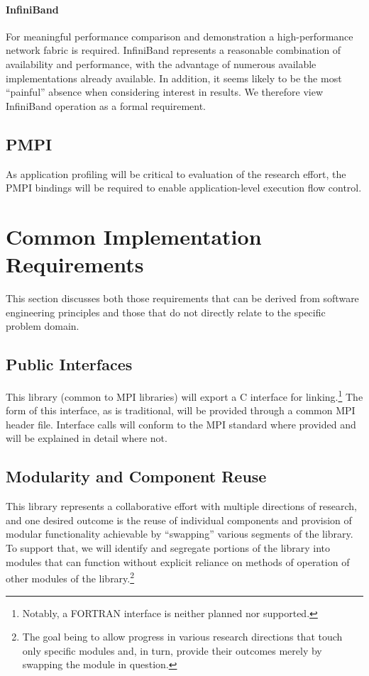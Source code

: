 \documentclass{article}
\begin{document}
\paragraph{InfiniBand}  For meaningful performance comparison and demonstration a high-performance network fabric is required.  InfiniBand represents a reasonable combination of availability and performance, with the advantage of numerous available implementations already available.  In addition, it seems likely to be the most ``painful'' absence when considering interest in results.  We therefore view InfiniBand operation as a formal requirement.

\subsection{PMPI}

As application profiling will be critical to evaluation of the research effort, the PMPI bindings will be required to enable application-level execution flow control.

\section{Common Implementation Requirements}

This section discusses both those requirements that can be derived from software engineering principles and those that do not directly relate to the specific problem domain.

\subsection{Public Interfaces}

This library (common to MPI libraries) will export a C interface for linking.\footnote{Notably, a FORTRAN interface is neither planned nor supported.}  The form of this interface, as is traditional, will be provided through a common MPI header file.  Interface calls will conform to the MPI standard where provided and will be explained in detail where not.

\subsection{Modularity and Component Reuse}

This library represents a collaborative effort with multiple directions of research, and one desired outcome is the reuse of individual components and provision of modular functionality achievable by ``swapping'' various segments of the library.  To support that, we will identify and segregate portions of the library into modules that can function without explicit reliance on methods of operation of other modules of the library.\footnote{The goal being to allow progress in various research directions that touch only specific modules and, in turn, provide their outcomes merely by swapping the module in question.}
\end{document}
